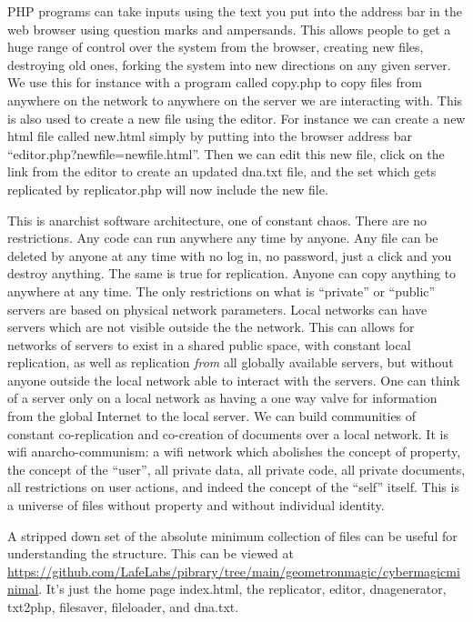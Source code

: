 PHP programs can take inputs using the text you put into the address bar
in the web browser using question marks and ampersands. This allows
people to get a huge range of control over the system from the browser,
creating new files, destroying old ones, forking the system into new
directions on any given server. We use this for instance with a program
called copy.php to copy files from anywhere on the network to anywhere
on the server we are interacting with. This is also used to create a new
file using the editor. For instance we can create a new html file called
new.html simply by putting into the browser address bar
``editor.php?newfile=newfile.html''. Then we can edit this new file,
click on the link from the editor to create an updated dna.txt file, and
the set which gets replicated by replicator.php will now include the new
file.

This is anarchist software architecture, one of constant chaos. There
are no restrictions. Any code can run anywhere any time by anyone. Any
file can be deleted by anyone at any time with no log in, no password,
just a click and you destroy anything. The same is true for replication.
Anyone can copy anything to anywhere at any time. The only restrictions
on what is ``private'' or ``public'' servers are based on physical
network parameters. Local networks can have servers which are not
visible outside the the network. This can allows for networks of servers
to exist in a shared public space, with constant local replication, as
well as replication \emph{from} all globally available servers, but
without anyone outside the local network able to interact with the
servers. One can think of a server only on a local network as having a
one way valve for information from the global Internet to the local
server. We can build communities of constant co-replication and
co-creation of documents over a local network. It is wifi
anarcho-communism: a wifi network which abolishes the concept of
property, the concept of the ``user'', all private data, all private
code, all private documents, all restrictions on user actions, and
indeed the concept of the ``self'' itself. This is a universe of files
without property and without individual identity.

A stripped down set of the absolute minimum collection of files can be
useful for understanding the structure. This can be viewed at
\url{https://github.com/LafeLabs/pibrary/tree/main/geometronmagic/cybermagicminimal}.
It's just the home page index.html, the replicator, editor,
dnagenerator, txt2php, filesaver, fileloader, and dna.txt.

